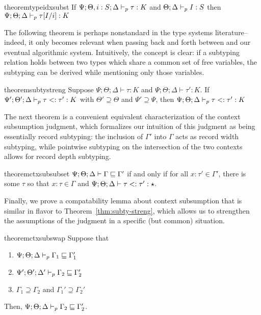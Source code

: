 \begin{restatable}{theorem}{typeidxsubst}
If $\Psi ; \Theta, i : S ; \Delta \vdash_p \tau : K$ and $\Theta ; \Delta \vdash_p I : S$ then $\Psi ; \Theta ; \Delta \vdash_p \tau[I/i] : K$
\label{thm:type-idx-subst}
\end{restatable}

The following theorem is perhaps nonstandard in the type systems literature-- indeed, it only becomes relevant when passing back and forth between \dlambdaamor and our eventual algorithmic system. Intuitively, the concept is clear: if a subtyping relation holds between two types which share a common set of free variables, the subtyping can be derived while mentioning only those variables.

\begin{restatable}{theorem}{subtystreng}
Suppose $\Psi ; \Theta ; \Delta \vdash \tau : K$ and $\Psi ; \Theta ; \Delta \vdash \tau' : K$.
If $\Psi' ; \Theta' ; \Delta \vdash_p \tau <: \tau' : K$ with $\Theta' \supseteq \Theta$ and $\Psi' \supseteq \Psi$, then $\Psi ; \Theta ; \Delta \vdash_p \tau <: \tau' : K$
\label{thm:subty-streng}
\end{restatable}

The next theorem is a convenient equivalent characterization of the context subsumption judgment, which formalizes our intuition of this judgment as being essentially record subtyping: the inclusion of $\Gamma'$ into $\Gamma$ acts as record width subtyping, while pointwise subtyping on the intersection of the two contexts allows for record depth subtyping.

\begin{restatable}{theorem}{ctxsubsubset}
$\Psi ; \Theta ; \Delta \vdash \Gamma \sqsubseteq \Gamma'$ if and only if for all $x : \tau' \in \Gamma'$, there is some $\tau$ so that $x : \tau \in \Gamma$ and $\Psi ; \Theta ; \Delta \vdash \tau <: \tau' : \star$.
\label{thm:ctx-sub-subset2}
\end{restatable}

Finally, we prove a compatability lemma about context subsumption that is similar in flavor to Theorem~\ref{thm:subty-streng}, which allows us to strengthen the assumptions of the judgment in a specific (but common) situation.

\begin{restatable}{theorem}{ctxsubswap}
Suppose that
\begin{enumerate}
  \item $\Psi ; \Theta ; \Delta \vdash_p \Gamma_1 \sqsubseteq \Gamma_1'$
  \item $\Psi' ; \Theta' ;  \Delta' \vdash_p \Gamma_2 \sqsubseteq \Gamma_2'$
  \item $\Gamma_1 \supseteq \Gamma_2$ and $\Gamma_1' \supseteq \Gamma_2'$
\end{enumerate}
Then, $\Psi ; \Theta ; \Delta \vdash_p \Gamma_2 \sqsubseteq \Gamma_2'$.
\label{thm:ctx-sub-swap}
\end{restatable}


